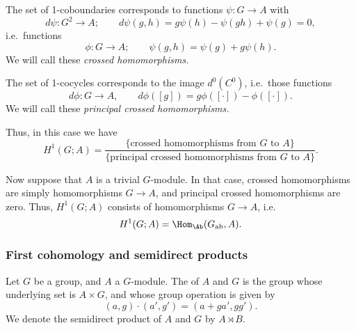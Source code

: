\documentclass[main.tex]{subfiles}
\begin{document}
The set of 1-coboundaries corresponds to functions $\psi\colon G \to A$ with
\begin{equation*}
  d\psi\colon G^{2} \to A;\qquad d\psi(g,h) = g\psi(h) - \psi(gh) + \psi(g) = 0,
\end{equation*}
i.e.\ functions
\begin{equation*}
  \phi\colon G \to A;\qquad \psi(g, h) = \psi(g) + g\psi(h).
\end{equation*}
We will call these \emph{crossed homomorphisms.}

The set of 1-cocycles corresponds to the image $d^{0}(C^{0})$, i.e.\ those functions
\begin{equation*}
  d\phi\colon G \to A,\qquad d\phi([g]) = g\phi([\cdot]) - \phi([\cdot]).
\end{equation*}
We will call these \emph{principal crossed homomorphisms.}

Thus, in this case we have
\begin{equation*}
  H^{1}(G; A) = \frac{\{\text{crossed homomorphisms from $G$ to $A$}\}}{\text{\{principal crossed homomorphisms from $G$ to $A$\}}}.
\end{equation*}

Now suppose that $A$ is a trivial $G$-module. In that case, crossed homomorphisms are simply homomorphisms $G \to A$, and principal crossed homomorphisms are zero. Thus, $H^{1}(G; A)$ consists of homomorphisms $G \to A$, i.e.\
\begin{equation*}
  H^{1}(G; A) = \Hom_{\Ab}(G_{\mathrm{ab}}, A).
\end{equation*}

\subsubsection{First cohomology and semidirect products}
\label{sss:first_cohomology_and_semidirect_products}

\begin{definition}
  \label{def:semidirect_product}
  Let $G$ be a group, and $A$ a $G$-module. The  of $A$ and $G$ is the group whose underlying set is $A \times G$, and whose group operation is given by
  \begin{equation*}
    (a, g) \cdot (a', g') = (a + g a', gg').
  \end{equation*}
  We denote the semidirect product of $A$ and $G$ by $A \rtimes B$.
\end{definition}
\end{document}
